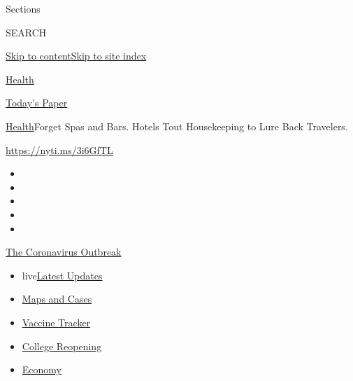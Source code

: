 Sections

SEARCH

\protect\hyperlink{site-content}{Skip to
content}\protect\hyperlink{site-index}{Skip to site index}

\href{https://www.nytimes3xbfgragh.onion/section/health}{Health}

\href{https://myaccount.nytimes3xbfgragh.onion/auth/login?response_type=cookie\&client_id=vi}{}

\href{https://www.nytimes3xbfgragh.onion/section/todayspaper}{Today's
Paper}

\href{/section/health}{Health}\textbar{}Forget Spas and Bars. Hotels
Tout Housekeeping to Lure Back Travelers.

\url{https://nyti.ms/3i6GfTL}

\begin{itemize}
\item
\item
\item
\item
\item
\end{itemize}

\href{https://www.nytimes3xbfgragh.onion/news-event/coronavirus?action=click\&pgtype=Article\&state=default\&region=TOP_BANNER\&context=storylines_menu}{The
Coronavirus Outbreak}

\begin{itemize}
\tightlist
\item
  live\href{https://www.nytimes3xbfgragh.onion/2020/08/04/world/coronavirus-cases.html?action=click\&pgtype=Article\&state=default\&region=TOP_BANNER\&context=storylines_menu}{Latest
  Updates}
\item
  \href{https://www.nytimes3xbfgragh.onion/interactive/2020/us/coronavirus-us-cases.html?action=click\&pgtype=Article\&state=default\&region=TOP_BANNER\&context=storylines_menu}{Maps
  and Cases}
\item
  \href{https://www.nytimes3xbfgragh.onion/interactive/2020/science/coronavirus-vaccine-tracker.html?action=click\&pgtype=Article\&state=default\&region=TOP_BANNER\&context=storylines_menu}{Vaccine
  Tracker}
\item
  \href{https://www.nytimes3xbfgragh.onion/2020/08/02/us/covid-college-reopening.html?action=click\&pgtype=Article\&state=default\&region=TOP_BANNER\&context=storylines_menu}{College
  Reopening}
\item
  \href{https://www.nytimes3xbfgragh.onion/live/2020/08/04/business/stock-market-today-coronavirus?action=click\&pgtype=Article\&state=default\&region=TOP_BANNER\&context=storylines_menu}{Economy}
\end{itemize}

